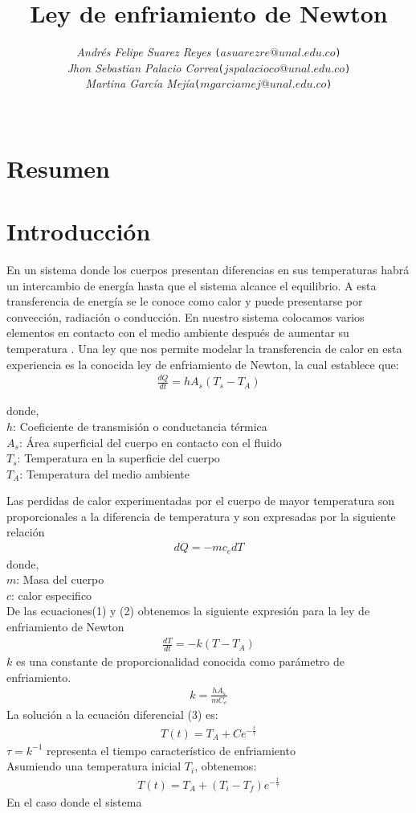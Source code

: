 \documentclass[10pt]{article}
\title{\textbf{Ley de enfriamiento de Newton
}}
\author{\textsl{Andrés Felipe Suarez Reyes  }\texttt{($asuarezre@unal.edu.co$)}\\\textsl{Jhon Sebastian Palacio Correa}\texttt{($jspalacioco@unal.edu.co$)}\\\textsl{Martina García Mejía}\texttt{($mgarciamej@unal.edu.co$)} \\
\rule{5cm}{0.3mm}}
\date{}
\begin{document}
\maketitle

\section*{Resumen}



\section{Introducción}

En un sistema donde los cuerpos presentan diferencias en sus temperaturas habrá un intercambio de energía hasta que el sistema alcance el equilibrio. A esta transferencia de energía  se le conoce como calor y puede presentarse por convección, radiación o conducción. 
En nuestro sistema colocamos varios elementos en contacto con el medio ambiente después de aumentar su temperatura . Una ley que nos permite modelar la transferencia de calor en esta experiencia es la conocida ley de enfriamiento de Newton, la cual establece que: 
\begin{align}
    \frac{dQ}{dt} = hA_s(T_s-T_A) 
\end{align}

donde,  \\ 
$h$:  Coeficiente de transmisión o conductancia térmica  \\ 
$A_s$: Área superficial del cuerpo en contacto con el fluido \\ 
$T_s$: Temperatura en la superficie del cuerpo \\ 
$T_A$: Temperatura del medio ambiente

Las perdidas de calor experimentadas por el cuerpo de mayor temperatura son proporcionales a la diferencia de temperatura y son expresadas por la siguiente relación 
\begin{align}
    dQ = -mc_edT
\end{align}
donde, \\ 
$m$: Masa del cuerpo \\ 
$c$: calor especifico \\ 
De las ecuaciones(1) y (2) obtenemos la siguiente expresión para la ley de enfriamiento de Newton 
\begin{align}
    \frac{dT}{dt} = -k(T-T_A)
\end{align}
$k$ es una constante de proporcionalidad conocida como parámetro de enfriamiento. 
\begin{align}
    k = \frac{hA_s}{mC_e}
\end{align}
La solución a la ecuación diferencial (3) es: 
\begin{align}
    T(t) = T_A + Ce^{-\frac{t}{\tau}}
\end{align}
$\tau = k^{-1}$ representa el tiempo característico de enfriamiento \\ 
Asumiendo una temperatura inicial $T_i$, obtenemos: 
\begin{align}
    T(t) = T_A + (T_i-T_f)e^{-\frac{t}{\tau}}
\end{align}
En el caso donde el sistema 
\end{document}
